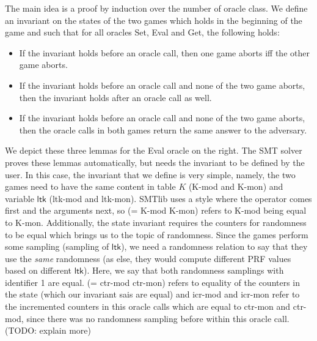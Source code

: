\documentclass[a4paper]{article}
\begin{document}
The main idea is a proof by induction over the number of oracle class. We define an invariant on the states of the two games which holds in the beginning of the game and such that for all oracles Set, Eval and Get, the following holds:
\begin{itemize}
\item If the invariant holds before an oracle call, then one game aborts iff the other game aborts.
\item If the invariant holds before an oracle call and none of the two game aborts, then the invariant holds after an oracle call as well.
\item If the invariant holds before an oracle call and none of the two game aborts, then the oracle calls in both games return the same answer to the adversary.
\end{itemize}
We depict these three lemmas for the Eval oracle on the right. The SMT solver proves these lemmas automatically, but needs the invariant to be defined by the user. In this case, the invariant that we define is very simple, namely, the two games need to have the same content in table $K$ (K-mod and K-mon) and variable $\mathsf{ltk}$ (ltk-mod and ltk-mon). SMTlib uses a style where the operator comes first and the arguments next, so (= K-mod K-mon) refers to K-mod being equal to K-mon. Additionally, the state invariant requires the counters for randomness to be equal which brings us to the topic of randomness. Since the games perform some sampling (sampling of $\mathsf{ltk}$), we need a randomness relation to say that they use the \emph{same} randomness (as else, they would compute different PRF values based on different $\mathsf{ltk}$). Here, we say that both randomness samplings with identifier 1 are equal. (= ctr-mod ctr-mon) refers to equality of the counters in the state (which our invariant sais are equal) and icr-mod and icr-mon refer to the incremented counters in this oracle calls which are equal to ctr-mon and ctr-mod, since there was no randomness sampling before within this oracle call. (TODO: explain more)


\end{document}
